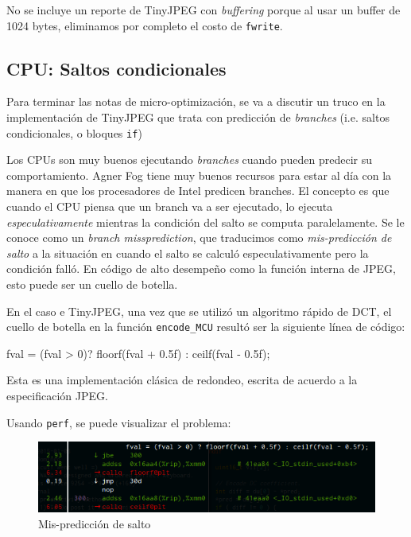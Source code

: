 No se incluye un reporte de TinyJPEG con \emph{buffering} porque al usar un
buffer de 1024 bytes, eliminamos por completo el costo de \verb+fwrite+.

\subsection{CPU: Saltos condicionales}\label{sub:cpu-branch}

Para terminar las notas de micro-optimización, se va a discutir un truco en la
implementación de TinyJPEG que trata con predicción de \emph{branches} (i.e.
saltos condicionales, o bloques \verb+if+)

Los CPUs son muy buenos ejecutando \emph{branches} cuando pueden predecir su
comportamiento. Agner Fog \cite{agner} tiene muy buenos recursos para estar al
día con la manera en que los procesadores de Intel predicen branches. El
concepto es que cuando el CPU piensa que un branch va a ser ejecutado, lo
ejecuta \emph{ especulativamente } mientras la condición del salto se computa
paralelamente. Se le conoce como un \emph{branch missprediction}, que
traducimos como \emph{mis-predicción de salto} a la situación en cuando el
salto se calculó especulativamente pero la condición falló. En código de alto
desempeño como la función interna de JPEG, esto puede ser un cuello de botella.

En el caso e TinyJPEG, una vez que se utilizó un algoritmo rápido de DCT, el
cuello de botella en la función \verb+encode_MCU+ resultó ser la siguiente
línea de código:

\begin{code}[language=C][h]
fval = (fval > 0)? floorf(fval + 0.5f) : ceilf(fval - 0.5f);
\end{code}

Esta es una implementación clásica de redondeo, escrita de acuerdo a la
especificación JPEG.

Usando \verb+perf+, se puede visualizar el problema:

\begin{figure}[hb]
    \includegraphics[width=5.16666in]{round_slow}
    \caption{Mis-predicción de salto}
\end{figure}

